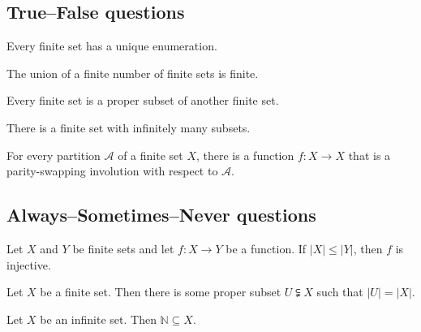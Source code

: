 \subsection*{True--False questions}


\begin{chapex} %
\label{cqCombinatoricsTFBegin}
Every finite set has a unique enumeration.
\end{chapex}

\begin{chapex} %
The union of a finite number of finite sets is finite.
\end{chapex}

\begin{chapex} %
Every finite set is a proper subset of another finite set.
\end{chapex}

\begin{chapex} %
There is a finite set with infinitely many subsets.
\end{chapex}

\begin{chapex} %
\label{cqCombinatoricsTFEnd}
For every partition $\mathcal{A}$ of a finite set $X$, there is a function $f : X \to X$ that is a parity-swapping involution with respect to $\mathcal{A}$.
\end{chapex}

\subsection*{Always--Sometimes--Never questions}


\begin{chapex} %
\label{cqCombinatoricsASNBegin}
Let $X$ and $Y$ be finite sets and let $f : X \to Y$ be a function. If $|X| \le |Y|$, then $f$ is injective.
\end{chapex}

\begin{chapex} %
Let $X$ be a finite set. Then there is some proper subset $U \subsetneqq X$ such that $|U| = |X|$.
\end{chapex}

\begin{chapex} %
Let $X$ be an infinite set. Then $\mathbb{N} \subseteq X$.
\end{chapex}

